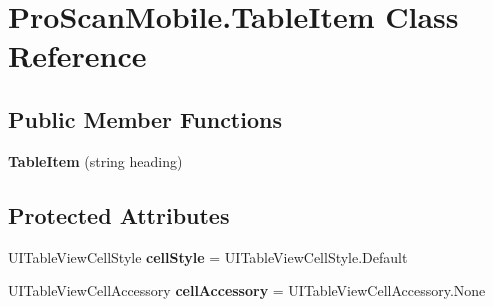 \hypertarget{class_pro_scan_mobile_1_1_table_item}{\section{Pro\-Scan\-Mobile.\-Table\-Item Class Reference}
\label{class_pro_scan_mobile_1_1_table_item}
}
\subsection*{Public Member Functions}
\begin{DoxyCompactItemize}
\item 
\hypertarget{class_pro_scan_mobile_1_1_table_item_a7cb46224e5cfb1be1b562a8e23de752e}{{\bfseries Table\-Item} (string heading)}\label{class_pro_scan_mobile_1_1_table_item_a7cb46224e5cfb1be1b562a8e23de752e}

\end{DoxyCompactItemize}
\subsection*{Protected Attributes}
\begin{DoxyCompactItemize}
\item 
\hypertarget{class_pro_scan_mobile_1_1_table_item_a3c805bad3df31206beb0cc5fa30198a8}{U\-I\-Table\-View\-Cell\-Style {\bfseries cell\-Style} = U\-I\-Table\-View\-Cell\-Style.\-Default}\label{class_pro_scan_mobile_1_1_table_item_a3c805bad3df31206beb0cc5fa30198a8}

\item 
\hypertarget{class_pro_scan_mobile_1_1_table_item_ada0606b5bff5c59c73ecd08ec0962e25}{U\-I\-Table\-View\-Cell\-Accessory {\bfseries cell\-Accessory} = U\-I\-Table\-View\-Cell\-Accessory.\-None}\label{class_pro_scan_mobile_1_1_table_item_ada0606b5bff5c59c73ecd08ec0962e25}

\end{DoxyCompactItemize}
